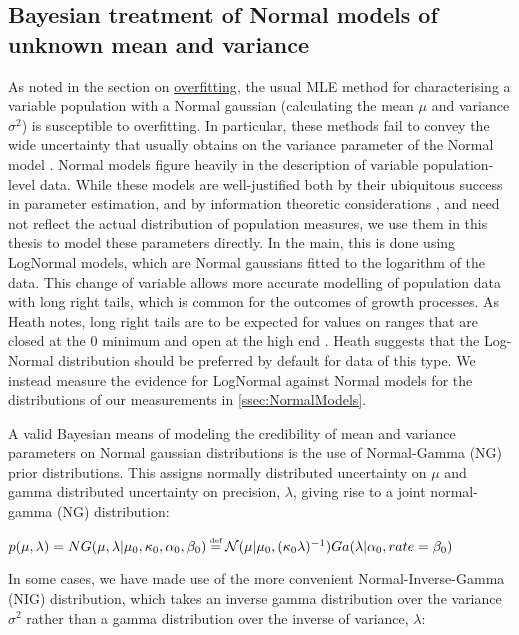 \documentclass{ut-thesis}
\begin{document}
\begin{NoHyper}
\subsection{Bayesian treatment of Normal models of unknown mean and variance}
\label{ssec:normalgamma}
As noted in the section on \hyperref[ssec:overfit]{overfitting}, the usual MLE method for characterising a variable population with a Normal gaussian (calculating the mean $\mu$ and variance $\sigma^{2}$) is susceptible to overfitting. In particular, these methods fail to convey the wide uncertainty that usually obtains on the variance parameter of the Normal model \cite{Murphy2007}. Normal models figure heavily in the description of variable population-level data. While these models are well-justified both by their ubiquitous success in parameter estimation, and by information theoretic considerations \cite{Jaynes2003}, and need not reflect the actual distribution of population measures, we use them in this thesis to model these parameters directly. In the main, this is done using LogNormal models, which are Normal gaussians fitted to the logarithm of the data. This change of variable allows more accurate modelling of population data with long right tails, which is common for the outcomes of growth processes. As Heath notes, long right tails are to be expected for values on ranges that are closed at the 0 minimum and open at the high end \cite{Heath1967}. Heath suggests that the Log-Normal distribution should be preferred by default for data of this type. We instead measure the evidence for LogNormal against Normal models for the distributions of our measurements in \autoref{ssec:NormalModels}.

A valid Bayesian means of modeling the credibility of mean and variance parameters on Normal gaussian distributions is the use of Normal-Gamma (NG) prior distributions. This assigns normally distributed uncertainty on $\mu$ and gamma distributed uncertainty on precision, $\lambda$, giving rise to a joint normal-gamma (NG) distribution:

$p(\mu,\lambda) = NG(\mu,\lambda|\mu_{0},\kappa_{0},\alpha_{0},\beta_{0}) \mathrel{\stackrel{\makebox[0pt]{\mbox{\normalfont\tiny def}}}{=}} \mathcal{N}(\mu|\mu_{0},(\kappa_{0}\lambda)^{-1})Ga(\lambda|\alpha_{0},rate=\beta_0)$ \cite{Murphy2007}

In some cases, we have made use of the more convenient Normal-Inverse-Gamma (NIG) distribution, which takes an inverse gamma distribution over the variance $\sigma^{2}$ rather than a gamma distribution over the inverse of variance, $\lambda$:


\end{NoHyper}
\end{document}
